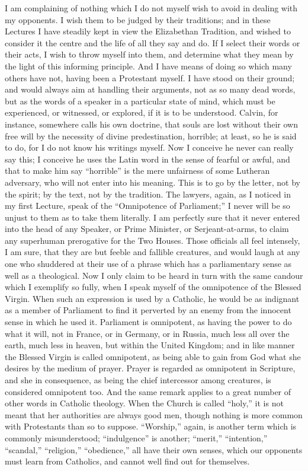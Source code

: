 I am complaining of nothing which I do not myself wish
to avoid in dealing with my opponents. I wish them to be
judged by their traditions; and in these Lectures I have
steadily kept in view the Elizabethan Tradition, and
wished to consider it the centre and the life of all they
say and do. If I select their words or their acts, I wish
to throw myself into them, and determine what they mean
by the light of this informing principle. And I have
means of doing so which many others have not, having been
a Protestant myself. I have stood on their ground; and
would always aim at handling their arguments, not as so
many dead words, but as the words of a speaker in a
particular state of mind, which must be experienced, or
witnessed, or explored, if it is to be understood.
Calvin, for instance, somewhere calls his own doctrine,
that souls are lost without their own free will by the
necessity of divine predestination, horrible; at least,
so he is said to do, for I do not know his writings
myself. Now I conceive he never can really say this; I
conceive he uses the Latin word in the sense of fearful
or awful, and that to make him say ``horrible''
is the mere unfairness of some Lutheran adversary, who
will not enter into his meaning. This is to go by the
letter, not by the spirit; by the text, not by the
tradition. The lawyers, again, as I noticed in my first
Lecture, speak of the ``Omnipotence of
Parliament;'' I never will be so unjust to them as to
take them literally. I am perfectly sure that it never
entered into the head of any Speaker, or Prime Minister,
or Serjeant-at-arms, to claim any superhuman prerogative
for the Two Houses. Those officials all feel intensely, I
am sure, that they are but feeble and fallible creatures,
and would laugh at any one who shuddered at their use of
a phrase which has a parliamentary sense as well as a
theological. Now I only claim to be heard in turn with
the same candour which I exemplify so fully, when I speak
myself of the omnipotence of the Blessed Virgin. When
such an expression is used by a Catholic, he would be as
indignant as a member of Parliament to find it perverted
by an enemy from the innocent sense in which he used it.
Parliament is omnipotent, as having the power to do what
it will, not in France, or in Germany, or in Russia, much
less all over the earth, much less in heaven, but within
the United Kingdom; and in like manner the Blessed Virgin
is called omnipotent, as being able to gain from God what
she desires by the medium of prayer. Prayer is regarded
as omnipotent in Scripture, and she in consequence, as
being the chief intercessor among creatures, is
considered omnipotent too. And the same remark applies to
a great number of other words in Catholic theology. When
the Church is called ``holy,'' it is not meant
that her authorities are always good men, though nothing
is more common with Protestants than so to suppose.
``Worship,'' again, is another term which is
commonly misunderstood; ``indulgence'' is
another; ``merit,'' ``intention,''
``scandal,'' ``religion,''
``obedience,'' all have their own senses, which
our opponents must learn from Catholics, and cannot well
find out for themselves.

